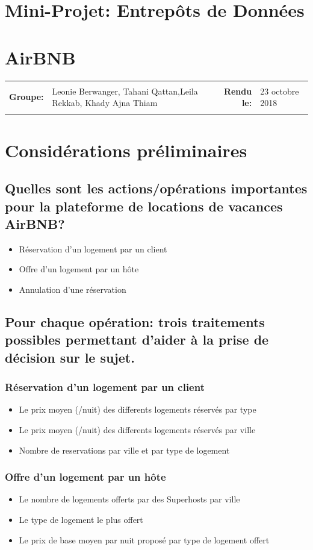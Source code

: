 \documentclass[11pt]{article}
\newcommand{\metaInfo}[4]{
	\begin{tabularx}{\textwidth}{rXrl}
	\hline \\
	\textbf{Groupe:}	& #1 &  \textbf{Rendu le:}   & #2 \\
	\\ \hline
	\end{tabularx}
}
\newcommand{\heading}[2]{
	\begin{center}
	\section*{#1}
	\section*{#2}
	\end{center}
}
\begin{document}
\heading{Mini-Projet: Entrepôts de Données}{AirBNB}
\metaInfo{Leonie Berwanger, Tahani Qattan,\newline Leila Rekkab, Khady Ajna Thiam}{23 octobre 2018}

\section{}
\section{Considérations préliminaires}
\subsection{Quelles sont les actions/opérations importantes pour la plateforme de locations de vacances AirBNB?}
\begin{itemize}
	\item Réservation d'un logement par un client
	\item Offre d'un logement par un hôte
	\item Annulation d'une réservation
\end{itemize}
\subsection{Pour chaque opération: trois traitements possibles permettant d’aider à la prise de décision sur le sujet.}
\subsubsection*{Réservation d'un logement par un client}
\begin{itemize}
	\item Le prix moyen (/nuit) des differents logements réservés par type
	\item Le prix moyen (/nuit) des differents logements réservés par ville
	\item Nombre de reservations par ville et par type de logement
\end{itemize}
\subsubsection*{Offre d'un logement par un hôte}
\begin{itemize}
	\item Le nombre de logements offerts par des \og Superhosts \fg{} par ville
	\item Le type de logement le plus offert 
	\item Le prix de base moyen par nuit proposé par type de logement offert
\end{itemize}
\end{document}
